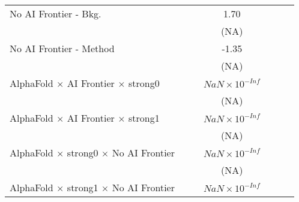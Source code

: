\begin{tabular}{lcccccc}
   No AI Frontier - Bkg.                                                      &                        &                        & 1.70                    &                         &      &   \\   
                                                                              &                        &                        & (NA)                    &                         &      &   \\   
   No AI Frontier - Method                                                    &                        &                        & -1.35                   &                         &      &   \\   
                                                                              &                        &                        & (NA)                    &                         &      &   \\   
   AlphaFold $\times$ AI Frontier $\times$ strong0                            &                        &                        & $NaN\times 10^{-Inf}$   &                         &      &   \\   
                                                                              &                        &                        & (NA)                    &                         &      &   \\   
   AlphaFold $\times$ AI Frontier $\times$ strong1                            &                        &                        & $NaN\times 10^{-Inf}$   &                         &      &   \\   
                                                                              &                        &                        & (NA)                    &                         &      &   \\   
   AlphaFold $\times$ strong0 $\times$ No AI Frontier                         &                        &                        & $NaN\times 10^{-Inf}$   &                         &      &   \\   
                                                                              &                        &                        & (NA)                    &                         &      &   \\   
   AlphaFold $\times$ strong1 $\times$ No AI Frontier                         &                        &                        & $NaN\times 10^{-Inf}$   &                         &      &   \\   

\end{tabular}
